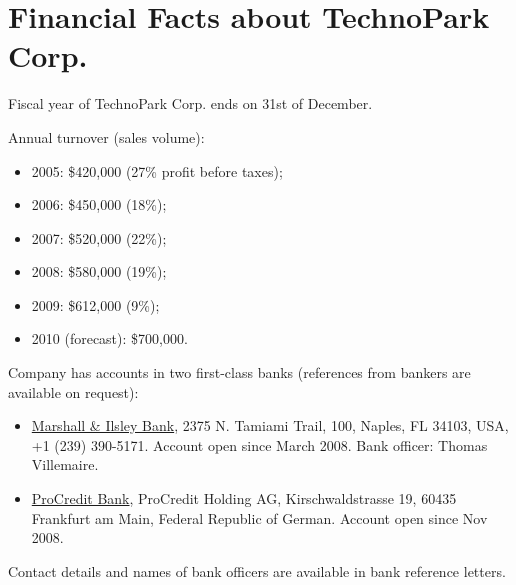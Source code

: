 
\section*{Financial Facts about TechnoPark Corp.}

Fiscal year of TechnoPark Corp. ends on 31st of December.

Annual turnover (sales volume):
\begin{itemize}
	\item 2005: \$420,000 (27\% profit before taxes);
	\item 2006: \$450,000 (18\%);
	\item 2007: \$520,000 (22\%);
	\item 2008: \$580,000 (19\%);
	\item 2009: \$612,000 (9\%);
	\item 2010 (forecast): \$700,000.
\end{itemize}	

Company has accounts in two first-class banks 
(references from bankers are available on request):
\begin{itemize}
	
	\item \href{http://www.mibank.com}{Marshall \& Ilsley Bank}, 
	2375 N. Tamiami Trail, 100, Naples, FL 34103, USA, +1 (239) 390-5171.
	Account open since March 2008. Bank officer: Thomas Villemaire.

	\item \href{http://www.procreditbank.com/}{ProCredit Bank}, 
	ProCredit Holding AG, Kirschwaldstrasse 19, 
    60435 Frankfurt am Main, Federal Republic of German.
    Account open since Nov 2008.

\end{itemize}	

Contact details and names of bank officers are available in 
bank reference letters.
